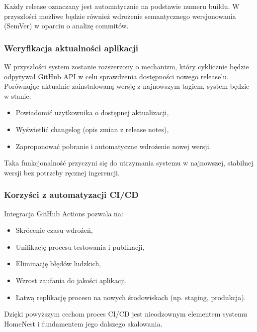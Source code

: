 Każdy release oznaczany jest automatycznie na podstawie numeru buildu. W przyszłości możliwe będzie również wdrożenie semantycznego wersjonowania (SemVer) w oparciu o analizę commitów.

\subsubsection{Weryfikacja aktualności aplikacji}

W przyszłości system zostanie rozszerzony o mechanizm, który cyklicznie będzie odpytywał GitHub API w celu sprawdzenia dostępności nowego release’u. Porównując aktualnie zainstalowaną wersję z najnowszym tagiem, system będzie w stanie:

\begin{itemize}
    \item Powiadomić użytkownika o dostępnej aktualizacji,
    \item Wyświetlić changelog (opis zmian z release notes),
    \item Zaproponować pobranie i automatyczne wdrożenie nowej wersji.
\end{itemize}

Taka funkcjonalność przyczyni się do utrzymania systemu w najnowszej, stabilnej wersji bez potrzeby ręcznej ingerencji.

\subsubsection{Korzyści z automatyzacji CI/CD}

Integracja GitHub Actions pozwala na:

\begin{itemize}
    \item Skrócenie czasu wdrożeń,
    \item Unifikację procesu testowania i publikacji,
    \item Eliminację błędów ludzkich,
    \item Wzrost zaufania do jakości aplikacji,
    \item Łatwą replikację procesu na nowych środowiskach (np. staging, produkcja).
\end{itemize}

Dzięki powyższym cechom proces CI/CD jest nieodzownym elementem systemu HomeNest i fundamentem jego dalszego skalowania.
